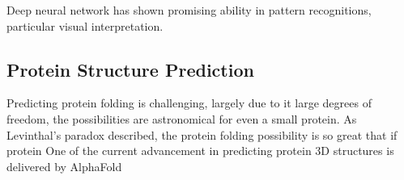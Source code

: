 Deep neural network has shown promising ability in pattern recognitions, particular visual interpretation.
\par 

\subsection{Protein Structure Prediction}
Predicting protein folding is challenging, largely due to it large degrees of freedom, the possibilities are astronomical for even a small protein. As Levinthal's paradox described, the protein folding possibility is so great that if protein  One of the current advancement in predicting protein 3D structures is delivered by AlphaFold